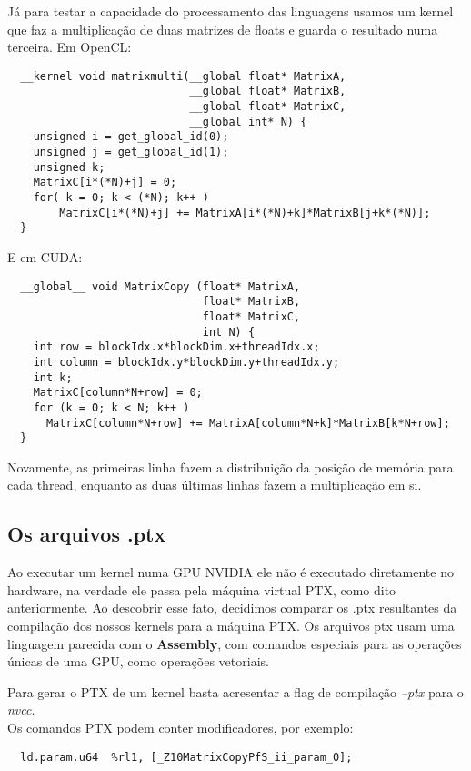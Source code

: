 Já para testar a capacidade do processamento das linguagens usamos um kernel que faz a multiplicação de duas matrizes de floats e guarda
o resultado numa terceira.
Em OpenCL:
\begin{lstlisting}
  __kernel void matrixmulti(__global float* MatrixA, 
                            __global float* MatrixB, 
                            __global float* MatrixC, 
                            __global int* N) {
    unsigned i = get_global_id(0);
    unsigned j = get_global_id(1);
    unsigned k;
    MatrixC[i*(*N)+j] = 0;
    for( k = 0; k < (*N); k++ ) 
    	MatrixC[i*(*N)+j] += MatrixA[i*(*N)+k]*MatrixB[j+k*(*N)];
  }
\end{lstlisting}
E em CUDA:
\begin{lstlisting}
  __global__ void MatrixCopy (float* MatrixA, 
                              float* MatrixB, 
                              float* MatrixC, 
                              int N) {
    int row = blockIdx.x*blockDim.x+threadIdx.x;
    int column = blockIdx.y*blockDim.y+threadIdx.y;
    int k;
    MatrixC[column*N+row] = 0;
    for (k = 0; k < N; k++ )
      MatrixC[column*N+row] += MatrixA[column*N+k]*MatrixB[k*N+row];
  }
\end{lstlisting}

Novamente, as primeiras linha fazem a distribuição da posição de memória para cada thread, enquanto as duas últimas linhas fazem a multiplicação em si.

\subsection{Os arquivos .ptx}

Ao executar um kernel numa GPU NVIDIA ele não é executado diretamente no hardware, na verdade ele passa pela máquina virtual PTX, como dito anteriormente.
Ao descobrir esse fato, decidimos comparar os .ptx resultantes da compilação dos nossos kernels para a máquina PTX.
Os arquivos ptx usam uma linguagem parecida com o \textbf{Assembly}, com comandos especiais para as operações únicas de uma GPU, como operações vetoriais.

Para gerar o PTX de um kernel basta acresentar a flag de compilação \textit{--ptx} para o \textit{nvcc}. \\

Os comandos PTX podem conter modificadores, por exemplo:

\begin{lstlisting}
  ld.param.u64 	%rl1, [_Z10MatrixCopyPfS_ii_param_0];
\end{lstlisting}

